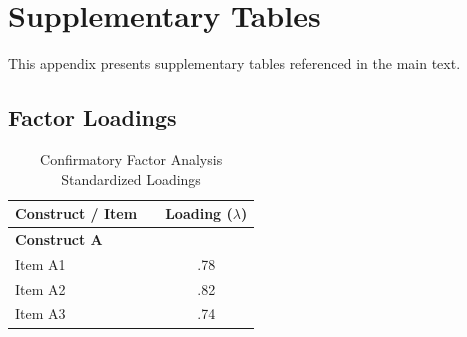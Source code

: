 
\section{Supplementary Tables}
\label{app:tables}

This appendix presents supplementary tables referenced in the main text.

\subsection{Factor Loadings}
\begin{table}[htbp]
    \caption{Confirmatory Factor Analysis Standardized Loadings}
    \label{tab:cfa_loadings}
    \begin{threeparttable}
        \begin{tabular}{llc}
            \toprule
            Construct / Item & & Loading ($\lambda$) \\
            \midrule
            \textbf{Construct A} & & \\
            \quad Item A1 & & .78 \\
            \quad Item A2 & & .82 \\
            \quad Item A3 & & .74 \\
            \bottomrule
        \end{tabular}
    \end{threeparttable}
\end{table}
